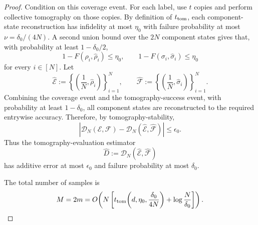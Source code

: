 \documentclass[aps,prx,reprint,superscriptaddress,amsmath,amssymb,longbibliography,floatfix]{revtex4-2}
\newcommand{\scD}{\mathcal{D}}
\newcommand{\scE}{\mathcal{E}}
\newcommand{\scF}{\mathcal{F}}
\theoremstyle{plain}
\theoremstyle{definition}
\theoremstyle{remark}
\begin{document}
\begin{proof}
Condition on this coverage event. For each label, use \(t\) copies and perform
collective tomography on those copies. By definition of \(t_{\rm tom}\), each
component-state reconstruction has infidelity at most \(\eta_0\) with failure
probability at most \(\nu=\delta_0/(4N)\). A second union bound over the \(2N\)
component states gives that, with probability at least \(1-\delta_0/2\),
\[
    1-F(\rho_i,\widehat\rho_i)\le \eta_0,
    \qquad
    1-F(\sigma_i,\widehat\sigma_i)\le \eta_0
\]
for every \(i\in[N]\). Let
\[
    \widehat{\scE}
    :=
    \left\{\left(\frac1N,\widehat\rho_i\right)\right\}_{i=1}^N,
    \qquad
    \widehat{\scF}
    :=
    \left\{\left(\frac1N,\widehat\sigma_i\right)\right\}_{i=1}^N .
\]
Combining the coverage event and the tomography-success event, with probability
at least \(1-\delta_0\), all component states are reconstructed to the required
entrywise accuracy. Therefore, by tomography-stability,
\begin{equation}
    \left|
        \scD_N(\scE,\scF)
        -
        \scD_N(\widehat{\scE},\widehat{\scF})
    \right|
    \le
    \epsilon_0 .
\label{eq:app-tomography-distance-accuracy}
\end{equation}
Thus the tomography-evaluation estimator
\[
    \widehat D
    :=
    \scD_N(\widehat{\scE},\widehat{\scF})
\]
has additive error at most \(\epsilon_0\) and failure probability at most
\(\delta_0\).

The total number of samples is
\begin{equation}
    M=2m
    =
    O\!\left(
        N\left[
            t_{\rm tom}\!\left(d,\eta_0,\frac{\delta_0}{4N}\right)
            +
            \log\frac{N}{\delta_0}
        \right]
    \right).
\label{eq:app-tomography-general-complexity}
\end{equation}


\end{proof}
\end{document}

